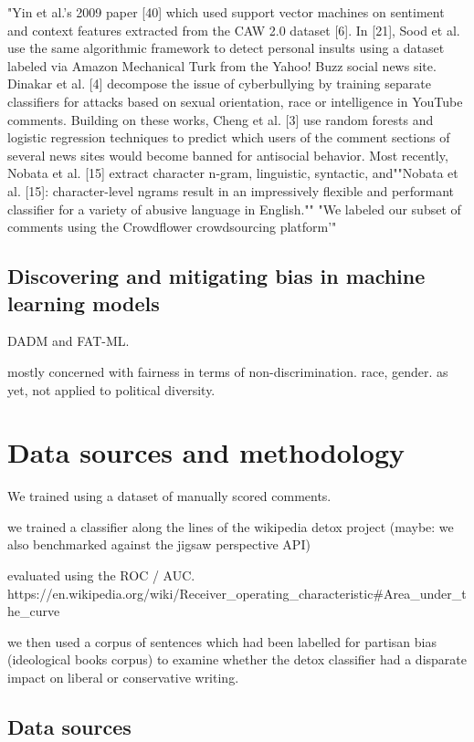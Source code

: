 \documentclass[sigconf]{acmart}
\begin{document}
"Yin et al.’s 2009 paper [40] which used support vector machines
on sentiment and context features extracted from the CAW
2.0 dataset [6]. In [21], Sood et al. use the same algorithmic framework
to detect personal insults using a dataset labeled via Amazon
Mechanical Turk from the Yahoo! Buzz social news site. Dinakar
et al. [4] decompose the issue of cyberbullying by training separate
classifiers for attacks based on sexual orientation, race or intelligence
in YouTube comments. Building on these works, Cheng et
al. [3] use random forests and logistic regression techniques to
predict which users of the comment sections of several news sites
would become banned for antisocial behavior. Most recently, Nobata
et al. [15] extract character n-gram, linguistic, syntactic, and""Nobata et al. [15]: character-level ngrams
result in an impressively flexible and performant classifier
for a variety of abusive language in English.""
"We labeled our subset of comments using the Crowdflower crowdsourcing
platform'"

\subsection{Discovering and mitigating bias in machine learning models}
DADM and FAT-ML.

mostly concerned with fairness in terms of non-discrimination. race, gender. as yet, not applied to political diversity.

\section{Data sources and methodology}

We trained using a dataset of manually scored comments.

we trained a classifier along the lines of the wikipedia detox project
(maybe: we also benchmarked against the jigsaw perspective API)

evaluated using the ROC / AUC.
https://en.wikipedia.org/wiki/Receiver_operating_characteristic#Area_under_the_curve

we then used a corpus of sentences which had been labelled for partisan bias (ideological books corpus) to examine whether the detox classifier had a disparate impact on liberal or conservative writing.

\subsection{Data sources}
\end{document}
